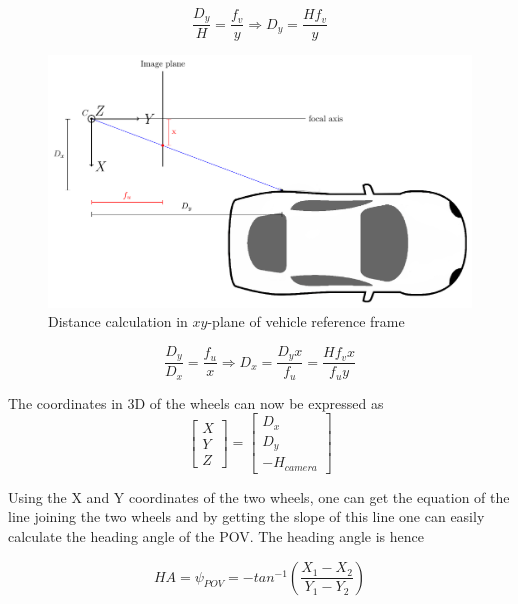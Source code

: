 \begin{equation}
    \frac{D_y}{H} = \frac{f_v}{y} \Rightarrow D_y = \frac{H f_v}{y}
\end{equation}



\begin{figure}[H]
    \centering
    \includegraphics[width=\textwidth]{Figures/D_x.pdf}
    \caption{Distance calculation in $xy$-plane of vehicle reference frame}
\end{figure}

\begin{equation}
    \frac{D_y}{D_x} = \frac{f_u}{x} \Rightarrow D_x = \frac{D_y x}{f_u} = \frac{H f_v x}{f_u y}
\end{equation}

The coordinates in 3D of the wheels can now be expressed as
\begin{equation*}
    \begin{bmatrix}
    X\\Y\\Z
    \end{bmatrix}
    =
    \begin{bmatrix}
    D_x\\D_y\\-H_{camera}
    \end{bmatrix}
\end{equation*}

Using the X and Y coordinates of the two wheels, one can get the equation of the line joining the two wheels and by getting the slope of this line one can easily calculate the heading angle of the POV. The heading angle is hence

\begin{equation}
    HA = \psi_{POV} = -tan^{-1} \left( \frac{X_1 - X_2}{Y_1 - Y_2} \right)
\end{equation}

